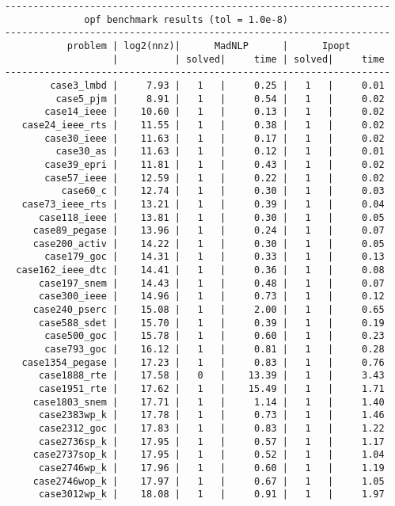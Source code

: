 \begin{lstlisting}
--------------------------------------------------------------------
              opf benchmark results (tol = 1.0e-8)
--------------------------------------------------------------------
           problem | log2(nnz)|      MadNLP      |      Ipopt        
                   |          | solved|     time | solved|     time     
--------------------------------------------------------------------
        case3_lmbd |     7.93 |   1   |     0.25 |   1   |     0.01
         case5_pjm |     8.91 |   1   |     0.54 |   1   |     0.02
       case14_ieee |    10.60 |   1   |     0.13 |   1   |     0.02
   case24_ieee_rts |    11.55 |   1   |     0.38 |   1   |     0.02
       case30_ieee |    11.63 |   1   |     0.17 |   1   |     0.02
         case30_as |    11.63 |   1   |     0.12 |   1   |     0.01
       case39_epri |    11.81 |   1   |     0.43 |   1   |     0.02
       case57_ieee |    12.59 |   1   |     0.22 |   1   |     0.02
          case60_c |    12.74 |   1   |     0.30 |   1   |     0.03
   case73_ieee_rts |    13.21 |   1   |     0.39 |   1   |     0.04
      case118_ieee |    13.81 |   1   |     0.30 |   1   |     0.05
     case89_pegase |    13.96 |   1   |     0.24 |   1   |     0.07
     case200_activ |    14.22 |   1   |     0.30 |   1   |     0.05
       case179_goc |    14.31 |   1   |     0.33 |   1   |     0.13
  case162_ieee_dtc |    14.41 |   1   |     0.36 |   1   |     0.08
      case197_snem |    14.43 |   1   |     0.48 |   1   |     0.07
      case300_ieee |    14.96 |   1   |     0.73 |   1   |     0.12
     case240_pserc |    15.08 |   1   |     2.00 |   1   |     0.65
      case588_sdet |    15.70 |   1   |     0.39 |   1   |     0.19
       case500_goc |    15.78 |   1   |     0.60 |   1   |     0.23
       case793_goc |    16.12 |   1   |     0.81 |   1   |     0.28
   case1354_pegase |    17.23 |   1   |     0.83 |   1   |     0.76
      case1888_rte |    17.58 |   0   |    13.39 |   1   |     3.43
      case1951_rte |    17.62 |   1   |    15.49 |   1   |     1.71
     case1803_snem |    17.71 |   1   |     1.14 |   1   |     1.40
      case2383wp_k |    17.78 |   1   |     0.73 |   1   |     1.46
      case2312_goc |    17.83 |   1   |     0.83 |   1   |     1.22
      case2736sp_k |    17.95 |   1   |     0.57 |   1   |     1.17
     case2737sop_k |    17.95 |   1   |     0.52 |   1   |     1.04
      case2746wp_k |    17.96 |   1   |     0.60 |   1   |     1.19
     case2746wop_k |    17.97 |   1   |     0.67 |   1   |     1.05
      case3012wp_k |    18.08 |   1   |     0.91 |   1   |     1.97

\end{lstlisting}
